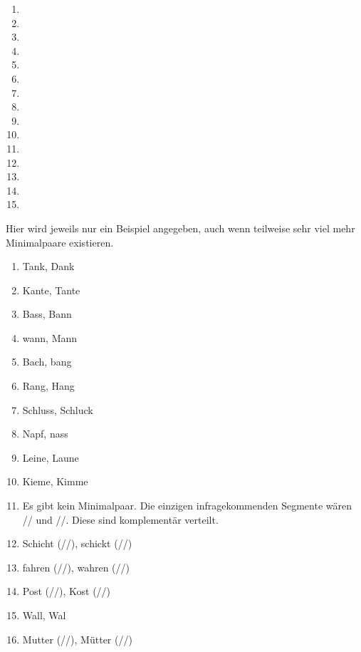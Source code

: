 
\begin{enumerate}\Lf
  \item {} 
  \item \textipa{[ni:z@n]}
  \item \textipa{[vIs@n]}
  \item {}
  \item \textipa{[defini\t{ts}Jo:n]}
  \item \textipa{[f5P\t{aE}nsh\t{aO}s]}
  \item \textipa{[kl\t{aE}nI\c{c}k\t{aE}t]}
  \item \textipa{[za:n@t\t{O@}t@]}
  \item \textipa{[hu:st@nzaft]}
  \item \textipa{[Po:n@]}
  \item \textipa{[b@StImUN]}
  \item \textipa{[tu:X]}
  \item \textipa{[SUps@n]}
  \item \textipa{[b\t{E@}\c{c}@n]}
  \item {}
\end{enumerate}



Hier wird jeweils nur ein Beispiel angegeben, auch wenn teilweise sehr viel mehr Minimalpaare existieren.

\begin{enumerate}\Lf
  \item Tank, Dank
  \item Kante, Tante
  \item Bass, Bann
  \item wann, Mann
  \item Bach, bang
  \item Rang, Hang
  \item Schluss, Schluck
  \item Napf, nass
  \item Leine, Laune
  \item Kieme, Kimme
  \item Es gibt kein Minimalpaar.
    Die einzigen infragekommenden Segmente wären // und //.
    Diese sind komplementär verteilt.
  \item Schicht (//), schickt (//)
  \item fahren (//), wahren (//)
  \item Post (//), Kost (//)
  \item Wall, Wal
  \item Mutter (//), Mütter (//)
\end{enumerate}


